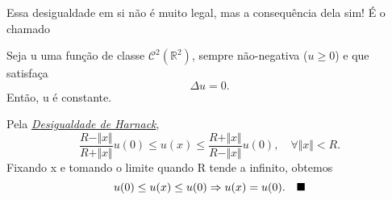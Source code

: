 \documentclass[../pde_notes.tex]{subfiles}
\begin{document}
Essa desigualdade em si não é muito legal, mas a consequência dela sim! É o chamado
\hypertarget{liouville_theorem}{
	\begin{theorem*}
		Seja u uma função de classe \(\mathcal{C}^{2}(\mathbb{R}^{2})\), sempre não-negativa (\(u\geq 0\)) e que satisfaça
		\[
			\Delta u = 0.
		\]
		Então, u é constante.
	\end{theorem*}
}
\begin{proof*}
	Pela \hyperlink{harnack_inequality}{\textit{Desigualdade de Harnack}},
	\[
		\frac{R-\Vert x \Vert}{R+\Vert x \Vert}u(0)\leq u(x)\leq \frac{R+\Vert x \Vert}{R-\Vert x \Vert}u(0),\quad \forall \Vert x \Vert<R.
	\]
	Fixando x e tomando o limite quando R tende a infinito, obtemos
	\[
		u(0)\leq u(x)\leq u(0) \Rightarrow u(x)=u(0). \quad \text{$\blacksquare$}
	\]
\end{proof*}
\end{document}
